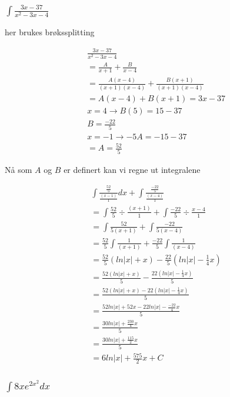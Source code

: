\documentclass{article}
\begin{document}
\subsubsection{$\int \frac{3x-37}{x^2-3x-4}$}

her brukes brøkssplitting

\begin{align*}
    & \frac{3x-37}{x^2-3x-4} \\
    &= \frac{A}{x+1} + \frac{B}{x-4} \\
    &= \frac{A(x-4)}{(x+1)(x-4)} + \frac{B(x+1)}{(x+1)(x-4)} \\
    &= A(x-4) + B(x+1) = 3x - 37 \\
    & x=4 \rightarrow B(5) = 15 - 37 \\
    & B = \frac{-22}{5} \\
    & x = -1 \rightarrow -5A = -15 -37 \\
    &= A = \frac{52}{5}
\end{align*}

Nå som $A$ og $B$ er definert kan vi regne ut integralene

\begin{align*}
    & \int \frac{\frac{52}{5}}{\frac{(x-1)}{1}} dx + \int \frac{\frac{-22}{5}}{\frac{(x-4)}{1}} \\
    &= \int \frac{52}{5} \div \frac{(x+1)}{1} + \int \frac{-22}{5} \div \frac{x-4}{1} \\
    &= \int \frac{52}{5(x+1)} + \int \frac{-22}{5(x-4)} \\
    &= \frac{52}{5} \int \frac{1}{(x+1)} + \frac{-22}{5} \int \frac{1}{(x-4)} \\
    &= \frac{52}{5} (ln|x| + x) - \frac{22}{5} (ln|x| - \frac{1}{4}{x}) \\
    &= \frac{52(ln|x| + x)}{5}  - \frac{22(ln|x| - \frac{1}{4}{x})}{5} \\
    &= \frac{52(ln|x| + x) - 22(ln|x| - \frac{1}{4}{x})}{5} \\
    &= \frac{52ln|x| + 52x - 22ln|x| - \frac{-22}{4}{x}}{5} \\
    &= \frac{30ln|x| + \frac{230}{4}x}{5} \\
    &= \frac{30ln|x| + \frac{115}{2}x}{5} \\
    &= 6ln|x| + \frac{575}{2}x+C
\end{align*}

\subsubsection{$\int 8xe^{2x^2}dx$}
\end{document}

